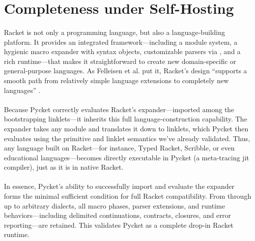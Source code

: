 	\section[\texorpdfstring{Completeness under Self-Hosting}{Completeness}]{Completeness under Self-Hosting}

		\paragraph{}%
			Racket is not only a programming language, but also a language‐building platform. It provides an integrated framework—including a module system, a hygienic macro expander with syntax objects, customizable parsers via , and a rich runtime—that makes it straightforward to create new domain‑specific or general‑purpose languages. As Felleisen et al. put it, Racket’s design “supports a smooth path from relatively simple language extensions to completely new languages” \cite{racket:create-langs}.

		\paragraph{}%
			Because Pycket correctly evaluates Racket's expander—imported among the bootstrapping linklets—it inherits this full language‑construction capability. The expander takes any  module and translates it down to linklets, which Pycket then evaluates using the primitive and linklet semantics we've already validated. Thus, any language built on Racket—for instance, Typed Racket, Scribble, or even educational languages—becomes directly executable in Pycket (a meta-tracing \gls{jit} compiler), just as it is in native Racket.

		\paragraph{}%
			In essence, Pycket’s ability to successfully import and evaluate the expander forms the minimal sufficient condition for full Racket compatibility. From  through  up to arbitrary  dialects, all macro phases, parser extensions, and runtime behaviors—including delimited continuations, contracts, closures, and error reporting—are retained. This validates Pycket as a complete drop‑in Racket runtime.

